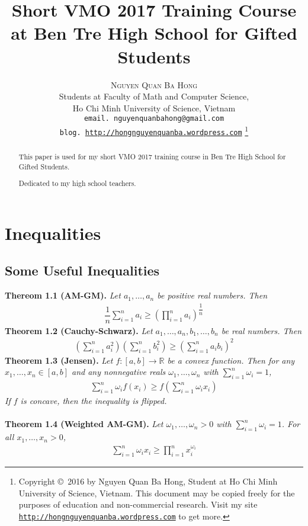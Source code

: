 \documentclass[a4paper,oneside]{article}
\title{\huge Short VMO 2017 Training Course at Ben Tre High School for Gifted Students}
\author{\textsc{Nguyen Quan Ba Hong}\\
{\small Students at Faculty of Math and Computer Science,}\\ 
{\small Ho Chi Minh University of Science, Vietnam} \\
{\small \texttt{email. nguyenquanbahong@gmail.com}}\\
{\small \texttt{blog. \url{http://hongnguyenquanba.wordpress.com}} 
\footnote{Copyright \copyright\ 2016 by Nguyen Quan Ba Hong, Student at Ho Chi Minh University of Science, Vietnam. This document may be copied freely for the purposes of education and non-commercial research. Visit my site \texttt{\url{http://hongnguyenquanba.wordpress.com}} to get more.}}}
\numberwithin{equation}{section}
\begin{document}
\maketitle
\begin{abstract}
This paper is used for my short VMO 2017 training course in Ben Tre High School for Gifted Students. 

Dedicated to my high school teachers.
\end{abstract}
\newpage
\tableofcontents
\newpage

\section{Inequalities}
\subsection{Some Useful Inequalities}
\textbf{Thereom 1.1 (AM-GM).} \textit{Let $a_1,\ldots,a_n$ be positive real numbers. Then}
\begin{align}
\dfrac{1}{n}\sum\limits_{i = 1}^n {{a_i}}  \ge {\left( {\prod\limits_{i = 1}^n {{a_i}} } \right)^{\dfrac{1}{n}}}
\end{align}
\textbf{Theorem 1.2 (Cauchy-Schwarz).} \textit{Let $a_1,\ldots,a_n,b_1,\ldots,b_n$ be real numbers. Then}
\begin{align}
\left( {\sum\limits_{i = 1}^n {a_i^2} } \right)\left( {\sum\limits_{i = 1}^n {b_i^2} } \right) \ge {\left( {\sum\limits_{i = 1}^n {{a_i}{b_i}} } \right)^2}
\end{align}
\textbf{Theorem 1.3 (Jensen).} \textit{Let $f:\left[a,b\right] \to \mathbb{R}$ be a convex function. Then for any $x_1,\ldots,x_n \in \left[a,b\right]$ and any nonnegative reals ${\omega _1}, \ldots ,{\omega _n}$ with $\sum\limits_{i = 1}^n {{\omega _i}}  = 1$,}
\begin{align}
\sum\limits_{i = 1}^n {{\omega _i}f\left( {{x_i}} \right)}  \ge f\left( {\sum\limits_{i = 1}^n {{\omega _i}{x_i}} } \right)
\end{align}
\textit{If $f$ is concave, then the inequality is flipped.}\\
\\
\textbf{Theorem 1.4 (Weighted AM-GM).} \textit{Let ${\omega _1}, \ldots ,{\omega _n} > 0$ with $\sum\limits_{i = 1}^n {{\omega _i}}  = 1$. For all $x_1,\ldots,x_n >0$,}
\begin{align}
\sum\limits_{i = 1}^n {{\omega _i}{x_i}}  \ge \prod\limits_{i = 1}^n {x_i^{{\omega _i}}} 
\end{align}
\end{document}

